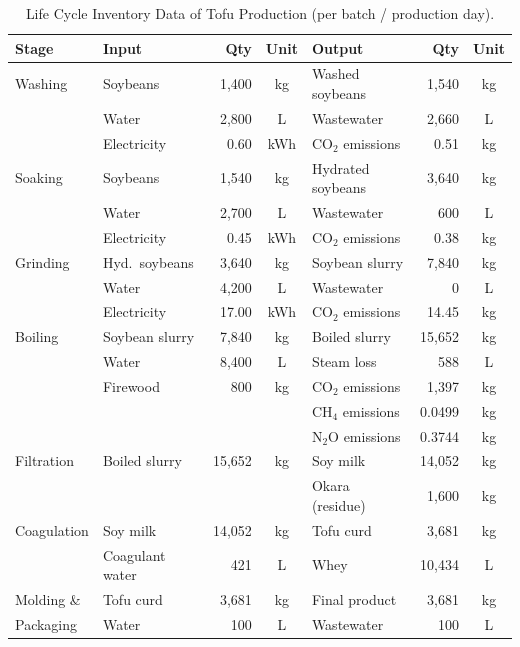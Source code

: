 \documentclass[12pt,a4paper]{article}
\begin{document}
\begin{table}[H]
\centering
\caption{Life Cycle Inventory Data of Tofu Production (per batch / production day).}
\label{tab:lci}
\small
\begin{tabularx}{\textwidth}{lXrclrc}
\toprule
\textbf{Stage} & \textbf{Input} & \textbf{Qty} & \textbf{Unit}
  & \textbf{Output} & \textbf{Qty} & \textbf{Unit}\\
\midrule
Washing       & Soybeans      & 1{,}400 & kg  & Washed soybeans   & 1{,}540 & kg  \\
              & Water         & 2{,}800 & L   & Wastewater        & 2{,}660 & L   \\
              & Electricity   & 0.60    & kWh & CO$_2$ emissions  & 0.51    & kg  \\
\midrule
Soaking       & Soybeans      & 1{,}540 & kg  & Hydrated soybeans & 3{,}640 & kg  \\
              & Water         & 2{,}700 & L   & Wastewater        & 600     & L   \\
              & Electricity   & 0.45    & kWh & CO$_2$ emissions  & 0.38    & kg  \\
\midrule
Grinding      & Hyd.\ soybeans& 3{,}640 & kg  & Soybean slurry    & 7{,}840 & kg  \\
              & Water         & 4{,}200 & L   & Wastewater        & 0       & L   \\
              & Electricity   & 17.00   & kWh & CO$_2$ emissions  & 14.45   & kg  \\
\midrule
Boiling       & Soybean slurry& 7{,}840 & kg  & Boiled slurry     &15{,}652 & kg  \\
              & Water         & 8{,}400 & L   & Steam loss        & 588     & L   \\
              & Firewood      & 800     & kg  & CO$_2$ emissions  & 1{,}397 & kg  \\
              &               &         &     & CH$_4$ emissions  & 0.0499  & kg  \\
              &               &         &     & N$_2$O emissions  & 0.3744  & kg  \\
\midrule
Filtration    & Boiled slurry &15{,}652 & kg  & Soy milk          &14{,}052 & kg  \\
              &               &         &     & Okara (residue)   & 1{,}600 & kg  \\
\midrule
Coagulation   & Soy milk      &14{,}052 & kg  & Tofu curd         & 3{,}681 & kg  \\
              & Coagulant water& 421    & L   & Whey              &10{,}434 & L   \\
\midrule
Molding \&    & Tofu curd     & 3{,}681 & kg  & Final product     & 3{,}681 & kg  \\
Packaging     & Water         & 100     & L   & Wastewater        & 100     & L   \\
\bottomrule
\end{tabularx}
\end{table}
\end{document}
